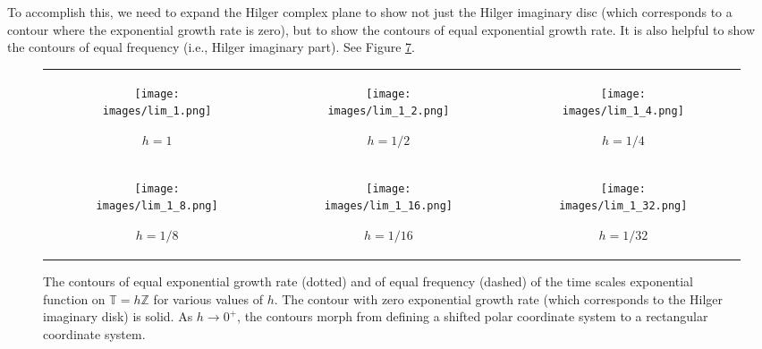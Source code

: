 \documentclass[reqno]{amsart}
\theoremstyle{plain}
\theoremstyle{definition}
\numberwithin{theorem}{section}
\numberwithin{definition}{section}
\numberwithin{prop}{section}
\numberwithin{example}{section}
\begin{document}
To accomplish this, we need to expand the Hilger complex plane to show not just the Hilger imaginary disc (which corresponds to a contour where the exponential growth rate is zero), but to show the contours of equal exponential growth rate. It is also helpful to show the contours of equal frequency (i.e., Hilger imaginary part). See Figure \ref{fig:h_limit}.

{\centering
\begin{figure}
\begin{tabular}{ccc}
\begin{subfigure}{0.33\textwidth}\centering\texttt{[image: images/lim\_1.png]}\caption{$h=1$}\label{fig:h_1}\end{subfigure}&
\begin{subfigure}{0.33\textwidth}\centering\texttt{[image: images/lim\_1\_2.png]}\caption{$h=1/2$}\label{fig:h_2}\end{subfigure}&
\begin{subfigure}{0.33\textwidth}\centering\texttt{[image: images/lim\_1\_4.png]}\caption{$h=1/4$}\label{fig:h_4}\end{subfigure}\\
\newline
\begin{subfigure}{0.33\textwidth}\centering\texttt{[image: images/lim\_1\_8.png]}\caption{$h=1/8$}\label{fig:h_8}\end{subfigure}&
\begin{subfigure}{0.33\textwidth}\centering\texttt{[image: images/lim\_1\_16.png]}\caption{$h=1/16$}\label{fig:h_16}\end{subfigure}&
\begin{subfigure}{0.33\textwidth}\centering\texttt{[image: images/lim\_1\_32.png]}\caption{$h=1/32$}\label{fig:h_32}\end{subfigure}\\
\end{tabular}
\caption{The contours of equal exponential growth rate (dotted) and of equal frequency (dashed) of the time scales exponential function on $\mathbb{T} = h \mathbb{Z}$ for various values of $h$. The contour with zero exponential growth rate (which corresponds to the Hilger imaginary disk) is solid. As $h\to 0^+$, the contours morph from defining a shifted polar coordinate system to a rectangular coordinate system.}
\label{fig:h_limit}
\end{figure}
}
\end{document}
